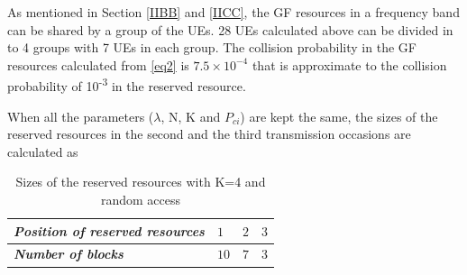 \documentclass[conference]{IEEEtran}
\begin{document}

As mentioned in Section \ref{IIBB} and \ref{IICC}, the GF resources in a frequency band can be shared by a group of the UEs. 28 UEs calculated above can be divided in to 4 groups with 7 UEs in each group. The collision probability in the GF resources calculated from \eqref{eq2} is $7.5\times10^{-4}$ that is approximate to the collision probability of 10\textsuperscript{-3} in the reserved resource.

When all the parameters ($\lambda$, N, K and $P_{ci}$) are kept the same, the sizes of the reserved resources in the second and the third transmission occasions are calculated as
\begin{table}[htbp]
\caption{Sizes of the reserved resources with K=4 and random access}
\begin{center}
\begin{tabular}{|p{10em}|p{2em}|p{2em}|p{2em}|}
 \hline
 \textbf{\textit{Position of reserved resources}} & $1$ &$2$ &$3$ \\ 
 \hline
 \textbf{\textit{Number of blocks}} & $10$ &$7$ &$3$ \\

 
 \hline
\end{tabular}
\label{tab1}
\end{center}
\end{table}
\end{document}
